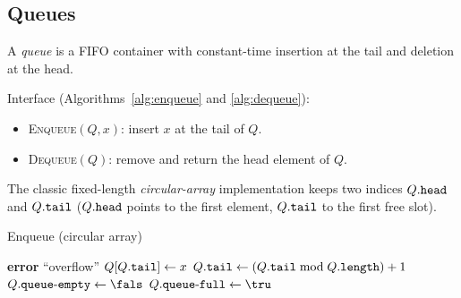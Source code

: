 \subsection{Queues}
\label{subsec:queues}

\begin{definition}[Queue]
A \emph{queue} is a FIFO container with constant-time insertion at the tail and deletion at the head.
\end{definition}


Interface (Algorithms~\ref{alg:enqueue} and \ref{alg:dequeue}):
\begin{itemize}%
  \item \textsc{Enqueue}\((Q,x)\): insert \(x\) at the tail of \(Q\).
  \item \textsc{Dequeue}\((Q)\): remove and return the head element of \(Q\).
\end{itemize}

The classic fixed-length \emph{circular-array} implementation keeps two indices \(Q\mathtt{.}\mathtt{head}\) and \(Q\mathtt{.}\mathtt{tail}\) (\(Q\mathtt{.}\mathtt{head}\) points to the first element, \(Q\mathtt{.}\mathtt{tail}\) to the first free slot).  


\begin{figure}[htb]
  \centering
  \label{fig:queue}
\end{figure}

\begin{algorithm}[htb]
  \caption{Enqueue (circular array)}
  \label{alg:enqueue}
  \begin{algorithmic}[1]
        \State \textbf{error} ``overflow''
      \EndIf
      \State $Q[Q\mathtt{.}\mathtt{tail}] \gets x$
      \State $Q\mathtt{.}\mathtt{tail} \gets (Q\mathtt{.}\mathtt{tail} \bmod Q\mathtt{.}\mathtt{length}) + 1$
      \State $\attrib{Q}{queue\mbox{-}empty} \gets \fals$
        \State $\attrib{Q}{queue\mbox{-}full} \gets \tru$
      \EndIf
    \EndFunction
  \end{algorithmic}
\end{algorithm}

